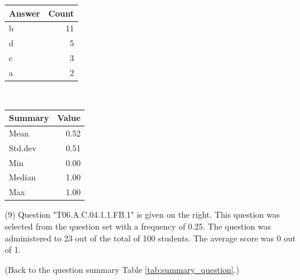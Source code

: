 \documentclass[12pt,nohyper]{tufte-handout}\usepackage[]{graphicx}\usepackage[]{color}
\begin{document}
\begin{center}%
\begin{tabular}{lr}
  \hline
Answer & Count \\ 
  \hline
b &  11 \\ 
  d &   5 \\ 
  c &   3 \\ 
  a &   2 \\ 
   \hline
\end{tabular}
~~~~~~~~%
\begin{tabular}{lr}
  \hline
Summary & Value \\ 
  \hline
Mean & 0.52 \\ 
  Std.dev & 0.51 \\ 
  Min & 0.00 \\ 
  Median & 1.00 \\ 
  Max & 1.00 \\ 
   \hline
\end{tabular}
\end{center}\newpage{} (9) Question "T06.A.C.04.1.1.FB.1" is given on the right. This question was selected from the question set with a frequency of 0.25. The question was administered to 23 out of the total of 100 students. The average score was 0 out of 1.

 (Back to the question summary Table \ref{tab:summary_question}.)
\end{document}
